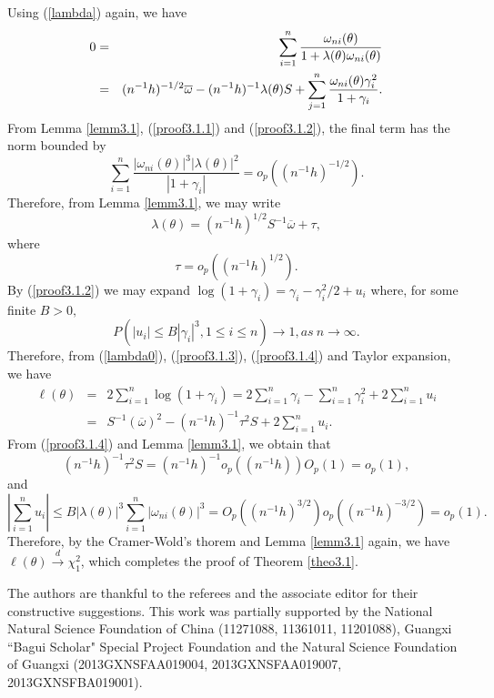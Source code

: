 \documentclass[12pt]{article}
\newcommand{\tod}{\stackrel{d}{\longrightarrow}}
\def\be{\begin{equation}}
\def\ee{\end{equation}}
\begin{document}
Using (\ref{lambda})  again, we have
\begin{eqnarray*}
0 & = & \sum_{i=1}^{n}{\omega_{ni}(\theta)\over 1+\lambda(\theta) \omega_{ni}(\theta)}\\
&=& (n^{-1}h)^{-1/2}\overline{\omega}- (n^{-1}h)^{-1}\lambda(\theta)S+
\sum_{j=1}^{n}\frac{\omega_{ni}(\theta)\gamma_i^2}{1+\gamma_i}.
\end{eqnarray*}
From Lemma \ref{lemm3.1}, (\ref{proof3.1.1}) and (\ref{proof3.1.2}), the final term has the norm bounded by
$$
\sum_{i=1}^{n}\frac{|\omega_{ni}(\theta)|^3|\lambda(\theta)|^2}{|1+\gamma_i|}=o_p((n^{-1}h)^{-1/2}).$$
Therefore, from Lemma \ref{lemm3.1}, we may write \be
\lambda(\theta)=(n^{-1}h)^{1/2}S^{-1}\overline{\omega}+\tau,
\label{proof3.1.3} \ee where \be \tau=o_p((n^{-1}h)^{1/2}).
\label{proof3.1.4} \ee By (\ref{proof3.1.2}) we may expand
$\log(1+\gamma_i)=\gamma_i-\gamma_i^2/2+u_i$ where, for some
finite $B>0,$
$$P(|u_i|\leq B|\gamma_i|^3, 1\leq i \leq n)\rightarrow 1, as ~n\rightarrow \infty.$$
Therefore, from (\ref{lambda0}), (\ref{proof3.1.3}), (\ref{proof3.1.4}) and Taylor expansion, we have
\begin{eqnarray*}
\ell(\theta)& = & 2\sum_{i=1}^{n} \log(
1+\gamma_i)=2\sum_{i=1}^{n}
\gamma_i-\sum_{i=1}^{n}\gamma_i^2+2\sum_{i=1}^{n}u_i\\
&=&  S^{-1}(\overline{\omega})^2
- (n^{-1}h)^{-1}\tau^2S+2\sum_{i=1}^{n}u_i.
\end{eqnarray*}
From  (\ref{proof3.1.4}) and Lemma \ref{lemm3.1}, we obtain that
\[(n^{-1}h)^{-1}\tau^2S=(n^{-1}h)^{-1}o_p((n^{-1}h))O_p(1)=o_p(1),\]
and
$$|\sum_{i=1}^{n}u_i|\leq B |\lambda(\theta)|^3\sum_{i=1}^{n}|\omega_{ni}(\theta)|^3
=O_p((n^{-1}h)^{3/2})o_p((n^{-1}h)^{-3/2})=o_p(1).$$ Therefore, by
the Cramer-Wold's thorem and Lemma \ref{lemm3.1} again, we have
$\ell(\theta)\tod \chi^2_1$, which completes the proof of Theorem
\ref{theo3.1}.




\vskip0.8cm  The authors are thankful to the referees and the associate editor for their constructive
suggestions. This work was partially supported by the National Natural Science Foundation of China
(11271088, 11361011, 11201088), Guangxi ``Bagui Scholar" Special Project Foundation and the Natural Science Foundation of
Guangxi (2013GXNSFAA019004, 2013GXNSFAA019007, 2013GXNSFBA019001).

 \vskip0.8cm
\end{document}
